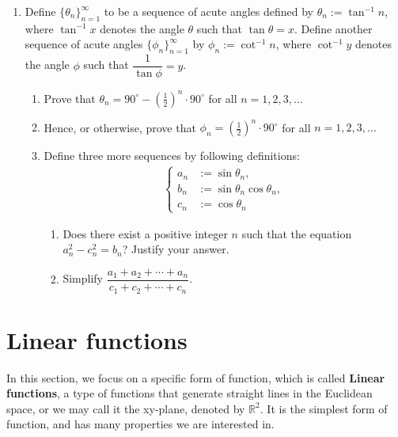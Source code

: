 \documentclass[12pt]{article}
\begin{document}
    \begin{enumerate}
        \item Define $\{\theta_n\}_{n=1}^{\infty}$ to be a sequence of acute angles defined by $\theta_n:= \tan^{-1}{n}$, where $\tan^{-1}{x}$ denotes the angle $\theta$ such that $\tan{\theta}=x$. Define another sequence of acute angles $\{\phi_n\}_{n=1}^{\infty}$ by $\phi_n:= \cot^{-1}{n}$, where $\cot^{-1}{y}$ denotes the angle $\phi$ such that $\dfrac{1}{\tan{\phi}}=y$.\begin{enumerate}
            \item Prove that $\theta_n=90^\circ - (\frac{1}{2})^n \cdot 90^\circ$ for all $n=1,2,3,\dots$
            \item Hence, or otherwise, prove that $\phi_n = (\frac{1}{2})^n \cdot 90^\circ$ for all $n=1,2,3,\dots$
            \item Define three more sequences by following definitions: \begin{align*}
                \begin{cases}
                    a_n &:= \sin{\theta_n},\\
                    b_n &:= \sin{\theta_n}\cos{\theta_n},\\
                    c_n &:= \cos{\theta_n}
                \end{cases}
            \end{align*}\begin{enumerate}
                \item Does there exist a positive integer $n$ such that the equation $a_n^2-c_n^2=b_n$? Justify your answer.
                \item Simplify $\dfrac{a_1+a_2+\cdots+a_n}{c_1+c_2+\cdots+c_n}$.
            \end{enumerate}
            
        \end{enumerate}
    \end{enumerate}

    \newpage

    \section{Linear functions}

    In this section, we focus on a specific form of function, which is called \textbf{Linear functions}, a type of functions that generate straight lines in the Euclidean space, or we may call it the xy-plane, denoted by $\mathbb{R}^2$. It is the simplest form of function, and has many properties we are interested in.
\end{document}
